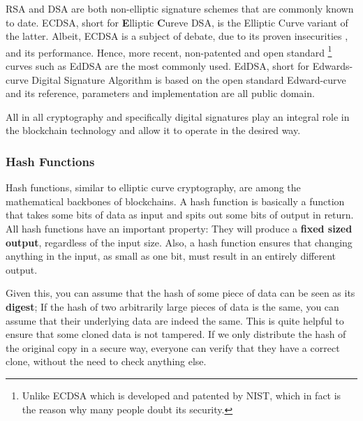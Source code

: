 RSA and DSA are both non-elliptic signature schemes that are commonly known to date. ECDSA, short
for \textbf{E}lliptic \textbf{C}ureve DSA, is the Elliptic Curve variant of the latter. Albeit,
ECDSA is a subject of debate, due to its proven insecurities
\cite{Brumley_Tuveri_2011_remote_timing_ecdsa}, and its performance. Hence, more recent,
non-patented and open standard \footnote{Unlike ECDSA which is developed and patented by NIST, which
in fact is the reason why many people doubt its security.} curves such as EdDSA are the most
commonly used. EdDSA, short for Edwards-curve Digital Signature Algorithm is based on the open
standard Edward-curve and its reference, parameters and implementation are all public domain.


All in all cryptography and specifically digital signatures play an integral role in the blockchain
technology and allow it to operate in the desired way.

\subsubsection{Hash Functions} \label{chap_bg:subsec:hash}

Hash functions, similar to elliptic curve cryptography, are among the mathematical backbones of
blockchains. A hash function is basically a function that takes some bits of data as input and spits
out some bits of output in return. All hash functions have an important property: They will produce
a \textbf{fixed sized output}, regardless of the input size. Also, a hash function ensures that
changing anything in the input, as small as one bit, must result in an entirely different output.

Given this, you can assume that the hash of some piece of data can be seen as its \textbf{digest};
If the hash of two arbitrarily large pieces of data is the same, you can assume that their
underlying data are indeed the same. This is quite helpful to ensure that some cloned data is not
tampered. If we only distribute the hash of the original copy in a secure way, everyone can verify
that they have a correct clone, without the need to check anything else.

